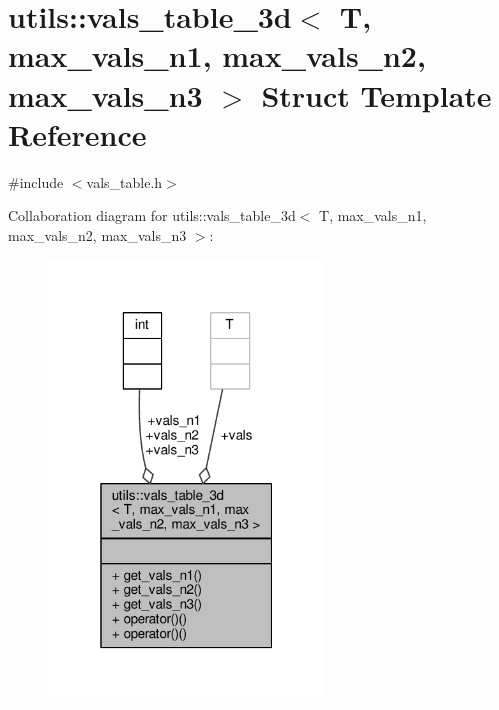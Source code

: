 \hypertarget{structutils_1_1vals__table__3d}{\section{utils\-:\-:vals\-\_\-table\-\_\-3d$<$ T, max\-\_\-vals\-\_\-n1, max\-\_\-vals\-\_\-n2, max\-\_\-vals\-\_\-n3 $>$ Struct Template Reference}
\label{structutils_1_1vals__table__3d}
}


{\ttfamily \#include $<$vals\-\_\-table.\-h$>$}



Collaboration diagram for utils\-:\-:vals\-\_\-table\-\_\-3d$<$ T, max\-\_\-vals\-\_\-n1, max\-\_\-vals\-\_\-n2, max\-\_\-vals\-\_\-n3 $>$\-:\nopagebreak
\begin{figure}[H]
\begin{center}
\leavevmode
\includegraphics[width=208pt]{structutils_1_1vals__table__3d__coll__graph}
\end{center}
\end{figure}
